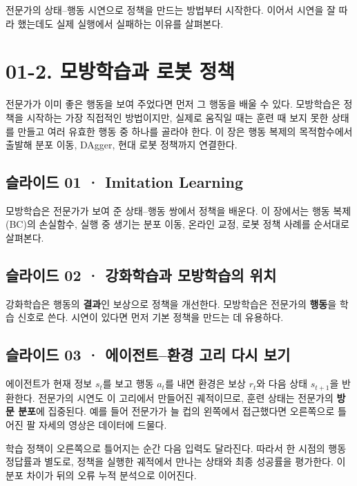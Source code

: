 \documentclass[11pt,a4paper]{article}
\begin{document}
전문가의 상태–행동 시연으로 정책을 만드는 방법부터 시작한다. 이어서 시연을 잘 따라 했는데도 실제 실행에서 실패하는 이유를 살펴본다.\par

\clearpage
\section{01-2. 모방학습과 로봇 정책}


전문가가 이미 좋은 행동을 보여 주었다면 먼저 그 행동을 배울 수 있다. 모방학습은 정책을 시작하는 가장 직접적인 방법이지만, 실제로 움직일 때는 훈련 때 보지 못한 상태를 만들고 여러 유효한 행동 중 하나를 골라야 한다. 이 장은 행동 복제의 목적함수에서 출발해 분포 이동, DAgger, 현대 로봇 정책까지 연결한다.\par

\subsection{슬라이드 01 · Imitation Learning}

모방학습은 전문가가 보여 준 상태–행동 쌍에서 정책을 배운다. 이 장에서는 행동 복제(BC)의 손실함수, 실행 중 생기는 분포 이동, 온라인 교정, 로봇 정책 사례를 순서대로 살펴본다.\par

\subsection{슬라이드 02 · 강화학습과 모방학습의 위치}

강화학습은 행동의 \textbf{결과}인 보상으로 정책을 개선한다. 모방학습은 전문가의 \textbf{행동}을 학습 신호로 쓴다. 시연이 있다면 먼저 기본 정책을 만드는 데 유용하다.\par

\subsection{슬라이드 03 · 에이전트–환경 고리 다시 보기}

에이전트가 현재 정보 $s_t$를 보고 행동 $a_t$를 내면 환경은 보상 $r_t$와 다음 상태 $s_{t+1}$을 반환한다. 전문가의 시연도 이 고리에서 만들어진 궤적이므로, 훈련 상태는 전문가의 \textbf{방문 분포}에 집중된다. 예를 들어 전문가가 늘 컵의 왼쪽에서 접근했다면 오른쪽으로 틀어진 팔 자세의 영상은 데이터에 드물다.\par

학습 정책이 오른쪽으로 틀어지는 순간 다음 입력도 달라진다. 따라서 한 시점의 행동 정답률과 별도로, 정책을 실행한 궤적에서 만나는 상태와 최종 성공률을 평가한다. 이 분포 차이가 뒤의 오류 누적 분석으로 이어진다.\par
\end{document}
